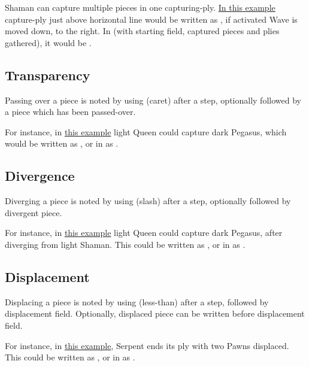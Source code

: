 Shaman can capture multiple pieces in one capturing-ply.
\hyperref[fig:scn_cot_04_light_shaman_capture_ply]{In this example} capture-ply just above
horizontal line would be written as , if activated Wave is moved
down, to the right. In  (with starting field, captured pieces and plies gathered),
it would be \alg{[Hd9.h10*P.l11*P.p12]\~{}[Wp12-n8]}.

\subsection*{Transparency}
\label{sec:Appendix/Notation/Transparency}

Passing over a piece is noted by using \alg{\^{}} (caret) after a step,
optionally followed by a piece which has been passed-over.

For instance, in \hyperref[fig:scn_mv_07_wave_is_transparent]{this example} light Queen
could capture dark Pegasus, which would be written as \newline
{}, or in  as \newline
{}.

\subsection*{Divergence}
\label{sec:Appendix/Notation/Divergence}

Diverging a piece is noted by using \alg{/} (slash) after a step, optionally followed
by divergent piece.

For instance, in \hyperref[fig:scn_cot_11_own_shaman_is_divergent_init]{this example}
light Queen could capture dark Pegasus, after diverging from light Shaman.
This could be written as , or in  as .

\subsection*{Displacement}
\label{sec:Appendix/Notation/Displacement}

Displacing a piece is noted by using \alg{<} (less-than) after a step, followed by
displacement field. Optionally, displaced piece can be written before displacement
field.

For instance, in \hyperref[fig:scn_tr_19_displacement_init]{this example}, Serpent ends
its ply with two Pawns displaced. This could be written as ,
or in  as \newline
{}.

